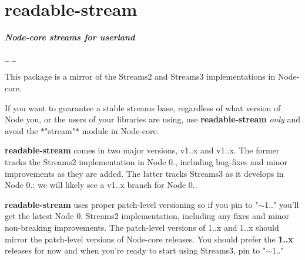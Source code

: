 \chapter{readable-\/stream}
\hypertarget{md__c_1_2_users_2_s_t_r_i_d_e_r_2source_2repos_2_ainslie_a_p_i_2wwwroot_2lib_2jquery-ui_2node__m023d793331611f9995b44dd011d31ba7}{}\label{md__c_1_2_users_2_s_t_r_i_d_e_r_2source_2repos_2_ainslie_a_p_i_2wwwroot_2lib_2jquery-ui_2node__m023d793331611f9995b44dd011d31ba7}
\label{md__c_1_2_users_2_s_t_r_i_d_e_r_2source_2repos_2_ainslie_a_p_i_2wwwroot_2lib_2jquery-ui_2node__m023d793331611f9995b44dd011d31ba7_autotoc_md2163}%
%
 {\itshape {\bfseries{Node-\/core streams for userland}}}

\href{https://nodei.co/npm/readable-stream/}{\texttt{ }} \href{https://nodei.co/npm/readable-stream/}{\texttt{ }}

This package is a mirror of the Streams2 and Streams3 implementations in Node-\/core.

If you want to guarantee a stable streams base, regardless of what version of Node you, or the users of your libraries are using, use {\bfseries{readable-\/stream}} {\itshape only} and avoid the \texorpdfstring{$\ast$}{*}"{}stream"{}\texorpdfstring{$\ast$}{*} module in Node-\/core.

{\bfseries{readable-\/stream}} comes in two major versions, v1..\+x and v1..\+x. The former tracks the Streams2 implementation in Node 0., including bug-\/fixes and minor improvements as they are added. The latter tracks Streams3 as it develops in Node 0.; we will likely see a v1..\+x branch for Node 0..

{\bfseries{readable-\/stream}} uses proper patch-\/level versioning so if you pin to {\ttfamily "{}\texorpdfstring{$\sim$}{\string~}1.."{}} you’ll get the latest Node 0. Streams2 implementation, including any fixes and minor non-\/breaking improvements. The patch-\/level versions of 1..\+x and 1..\+x should mirror the patch-\/level versions of Node-\/core releases. You should prefer the {\bfseries{1..\+x}} releases for now and when you’re ready to start using Streams3, pin to {\ttfamily "{}\texorpdfstring{$\sim$}{\string~}1.."{}} 